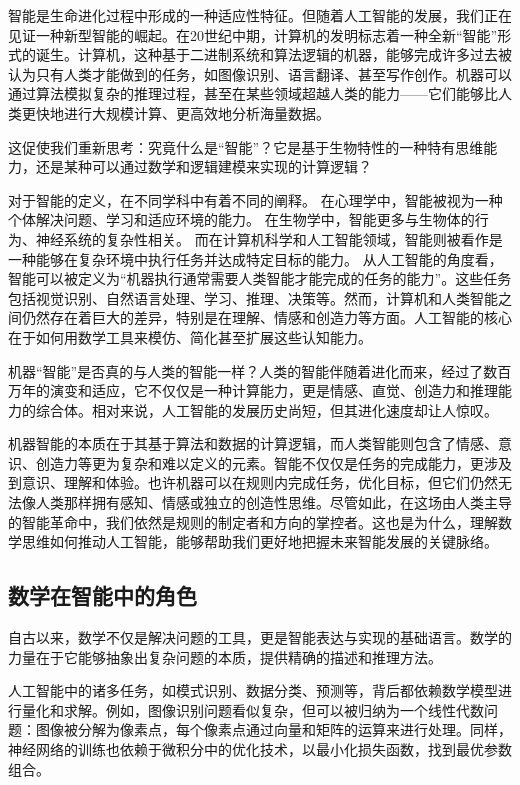 智能是生命进化过程中形成的一种适应性特征。但随着人工智能的发展，我们正在见证一种新型智能的崛起。在20世纪中期，计算机的发明标志着一种全新“智能”形式的诞生。计算机，这种基于二进制系统和算法逻辑的机器，能够完成许多过去被认为只有人类才能做到的任务，如图像识别、语言翻译、甚至写作创作。机器可以通过算法模拟复杂的推理过程，甚至在某些领域超越人类的能力——它们能够比人类更快地进行大规模计算、更高效地分析海量数据。

这促使我们重新思考：究竟什么是“智能”？它是基于生物特性的一种特有思维能力，还是某种可以通过数学和逻辑建模来实现的计算逻辑？

对于智能的定义，在不同学科中有着不同的阐释。
在心理学中，智能被视为一种个体解决问题、学习和适应环境的能力。
在生物学中，智能更多与生物体的行为、神经系统的复杂性相关。
而在计算机科学和人工智能领域，智能则被看作是一种能够在复杂环境中执行任务并达成特定目标的能力。
从人工智能的角度看，智能可以被定义为“机器执行通常需要人类智能才能完成的任务的能力”。这些任务包括视觉识别、自然语言处理、学习、推理、决策等。然而，计算机和人类智能之间仍然存在着巨大的差异，特别是在理解、情感和创造力等方面。人工智能的核心在于如何用数学工具来模仿、简化甚至扩展这些认知能力。

机器“智能”是否真的与人类的智能一样？人类的智能伴随着进化而来，经过了数百万年的演变和适应，它不仅仅是一种计算能力，更是情感、直觉、创造力和推理能力的综合体。相对来说，人工智能的发展历史尚短，但其进化速度却让人惊叹。

机器智能的本质在于其基于算法和数据的计算逻辑，而人类智能则包含了情感、意识、创造力等更为复杂和难以定义的元素。智能不仅仅是任务的完成能力，更涉及到意识、理解和体验。也许机器可以在规则内完成任务，优化目标，但它们仍然无法像人类那样拥有感知、情感或独立的创造性思维。尽管如此，在这场由人类主导的智能革命中，我们依然是规则的制定者和方向的掌控者。这也是为什么，理解数学思维如何推动人工智能，能够帮助我们更好地把握未来智能发展的关键脉络。

\subsection*{数学在智能中的角色}

自古以来，数学不仅是解决问题的工具，更是智能表达与实现的基础语言。数学的力量在于它能够抽象出复杂问题的本质，提供精确的描述和推理方法。

人工智能中的诸多任务，如模式识别、数据分类、预测等，背后都依赖数学模型进行量化和求解。例如，图像识别问题看似复杂，但可以被归纳为一个线性代数问题：图像被分解为像素点，每个像素点通过向量和矩阵的运算来进行处理。同样，神经网络的训练也依赖于微积分中的优化技术，以最小化损失函数，找到最优参数组合。

